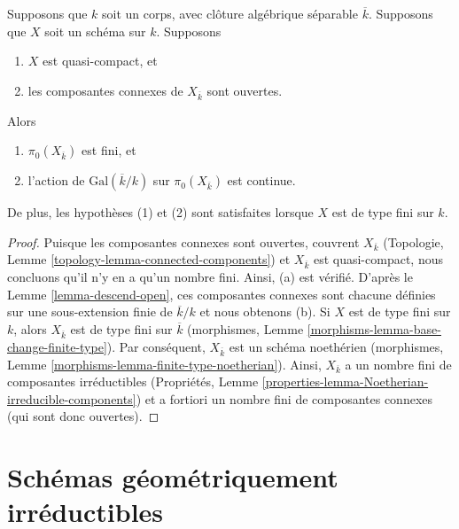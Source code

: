 \begin{lemma}
\label{lemma-galois-action-connected-components-continuous}
Supposons que $k$ soit un corps, avec clôture
algébrique séparable $\overline{k}$.
Supposons que $X$ soit un schéma sur $k$. Supposons
\begin{enumerate}
\item $X$ est quasi-compact, et \item les
composantes connexes de $X_{\overline{k}}$ sont ouvertes.
\end{enumerate}
Alors
\begin{enumerate}
\item [(a)] $\pi_0(X_{\overline{k}})$ est fini,
et \item [(b)] l'action de
$\text{Gal}(\overline{k}/k)$ sur $\pi_0(X_{\overline{k}})$ est continue.
\end{enumerate}
De plus, les hypothèses (1) et (2) sont
satisfaites lorsque $X$ est de type fini sur $k$.
\end{lemma}

\begin{proof}
Puisque les composantes connexes sont ouvertes, couvrent
$X_{\overline{k}}$ (Topologie, Lemme
\ref{topology-lemma-connected-components}) et
$X_{\overline{k}}$ est quasi-compact, nous concluons qu'il
n'y en a qu'un nombre fini. Ainsi, (a) est vérifié. D'après
le Lemme \ref{lemma-descend-open}, ces composantes connexes
sont chacune définies sur une sous-extension finie de
$\overline{k}/k$ et nous obtenons (b). Si $X$ est de type
fini sur $k$, alors $X_{\overline{k}}$ est de type fini sur
$\overline{k}$ (morphismes, Lemme
\ref{morphisms-lemma-base-change-finite-type}). Par conséquent,
$X_{\overline{k}}$ est un schéma noethérien (morphismes, Lemme
\ref{morphisms-lemma-finite-type-noetherian}). Ainsi,
$X_{\overline{k}}$ a un nombre fini de composantes irréductibles
(Propriétés, Lemme \ref{properties-lemma-Noetherian-irreducible-components})
et a fortiori un nombre fini de composantes connexes (qui sont donc ouvertes).
\end{proof}









\section{Schémas géométriquement irréductibles}
\label{section-geometrically-irreducible}

